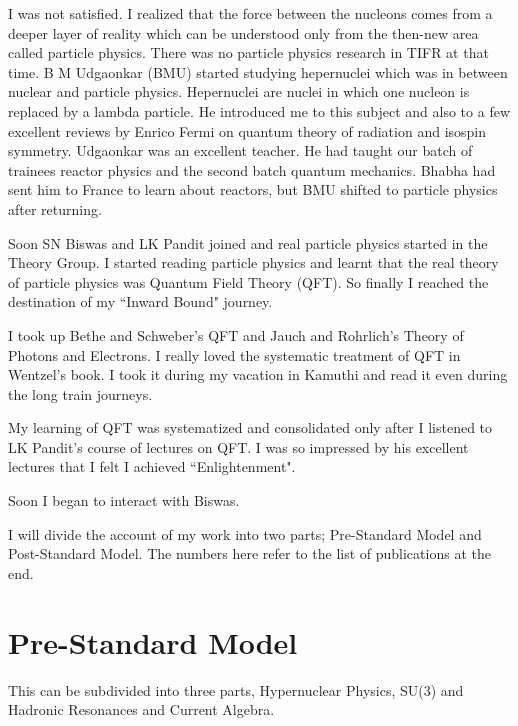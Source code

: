 I was not satisfied. I realized that the force between the nucleons 
comes from a deeper layer of reality which can be understood only from 
the then-new area called particle physics. There was no particle physics 
research in TIFR at that time. B M Udgaonkar (BMU) started studying 
hepernuclei which was in between nuclear and particle physics. 
Hepernuclei are nuclei in which one nucleon is replaced by a lambda 
particle. He introduced me to this subject and also to a few excellent 
reviews by Enrico Fermi on quantum theory of radiation and isospin 
symmetry. Udgaonkar was an excellent teacher. He had taught our batch of 
trainees reactor physics and the second batch quantum mechanics. Bhabha 
had sent him to France to learn about reactors, but BMU shifted to 
particle physics after returning.


Soon SN Biswas and LK Pandit joined and real particle physics started in 
the Theory Group. I started reading particle physics and learnt that the 
real theory of particle physics was Quantum Field Theory (QFT). So 
finally I reached the destination of my ``Inward Bound" journey.


I took up Bethe and Schweber's QFT and Jauch and Rohrlich's Theory of 
Photons and Electrons. I really loved the systematic treatment of QFT in 
Wentzel's book. I took it during my vacation in Kamuthi and read it even 
during the long train journeys.


My learning of QFT was systematized and consolidated only after I 
listened to LK Pandit's course of lectures on QFT. I was so impressed by 
his excellent lectures that I felt I achieved ``Enlightenment".


Soon I began to interact with Biswas.


I will divide the account of my work into two parts; Pre-Standard Model 
and Post-Standard Model. The numbers here refer to the list of 
publications at the end.

\section*{Pre-Standard Model}

\vspace{-.2cm}

This can be subdivided into three parts, Hypernuclear Physics, 
SU(3) and Hadronic Resonances and Current Algebra.


\vspace{-.3cm}

